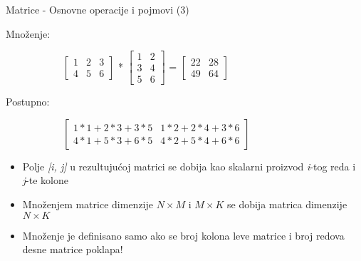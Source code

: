 \documentclass[bookmarks=true,bookmarksopen=true,pdfborder={0 0 0},pdfhighlight={/N},linkbordercolor={.5 .5 .5},implicit=false,unicode,xcolor={table}]{beamer}
\begin{document}
\begin{frame}{Matrice - Osnovne operacije i pojmovi (3)}

  Množenje:
  \begin{figure}
    \begin{subfigure}{9cm}
      $\begin{bmatrix}
        1 & 2 & 3\\
        4 & 5 & 6
        \end{bmatrix}$
      * 
      $\begin{bmatrix}
        1 & 2\\
        3 & 4\\
        5 & 6
        \end{bmatrix}$
      =
      $\begin{bmatrix}
        22 & 28\\
        49 & 64
        \end{bmatrix}$
    \end{subfigure}
  \end{figure}

  Postupno:
  \begin{figure}
    \begin{subfigure}{9cm}
      $\begin{bmatrix}
        1*1 + 2*3 + 3*5 & 1*2 + 2*4 + 3*6\\
        4*1 + 5*3 + 6*5 & 4*2 + 5*4 + 6*6
      \end{bmatrix}$
    \end{subfigure}
  \end{figure}
  \begin{itemize}
    \item Polje \textit{[i, j]} u rezultujućoj matrici se dobija kao skalarni proizvod \textit{i}-tog reda i \textit{j}-te kolone
    \item Množenjem matrice dimenzije $N \times M$ i $M \times K$ se dobija matrica dimenzije $N \times K$
    \item Množenje je definisano samo ako se broj kolona leve matrice i broj redova desne matrice poklapa!
  \end{itemize}

\end{frame}
\end{document}
